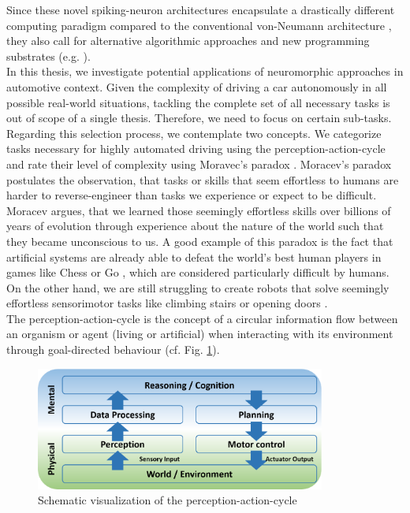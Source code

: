 Since these novel spiking-neuron architectures encapsulate a drastically different computing paradigm compared to the conventional von-Neumann architecture \cite{vonNeumann1993}, they also call for alternative algorithmic approaches and new programming substrates (e.g. \cite{Amir2013}).\\
In this thesis, we investigate potential applications of neuromorphic approaches in automotive context.
Given the complexity of driving a car autonomously in all possible real-world situations, tackling the complete set of all necessary tasks is out of scope of a single thesis.
Therefore, we need to focus on certain sub-tasks.
Regarding this selection process, we contemplate two concepts.
We categorize tasks necessary for highly automated driving using the perception-action-cycle and rate their level of complexity using Moravec's paradox \cite{Moravec1988}.
Moracev's paradox postulates the observation, that tasks or skills that seem effortless to humans are harder to reverse-engineer than tasks we experience or expect to be difficult.
Moracev argues, that we learned those seemingly effortless skills over billions of years of evolution through experience about the nature of the world such that they became unconscious to us.
A good example of this paradox is the fact that artificial systems are already able to defeat the world's best human players in games like Chess \cite{Hsu2002} or Go \cite{Silver2016}, which are considered particularly difficult by humans.
On the other hand, we are still struggling to create robots that solve seemingly effortless sensorimotor tasks like climbing stairs or opening doors \cite{Guizzo2015, Norton2017}.\\
The perception-action-cycle \cite{Fuster2004} is the concept of a circular information flow between an organism or agent (living or artificial) when interacting with its environment through goal-directed behaviour (cf. Fig. \ref{fig:perc-act-cicle}). 
\begin{figure}[t!]
	\centering
	\includegraphics[width=0.85\textwidth]{imgs/ActionPerceptionCycle.eps}
	\caption{Schematic visualization of the perception-action-cycle}
	\label{fig:perc-act-cicle}
\end{figure}
